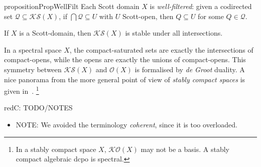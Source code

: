 \documentclass[%
  a4paper,
  UKenglish,
  cleveref,
  autoref,
  thm-restate,
  numberwithinsect,
]{lipics-v2021}
\newcommand\sle\subseteq
\newcommand\Open{\mathcal{O}}		%
\newcommand\K{\mathcal{K}}		%
\newcommand\Sat{\mathcal{S}}		%
\newenvironment{colinpar}{\begin{color}{red}\sffamily C:}{\end{color}}
\begin{document}
\begin{restatable}{proposition}{PropWellFilt}
\label{prop:sem:wf}
Each Scott domain $X$ is \emph{well-filtered}:
given a codirected
set $\mathcal{Q} \sle \K\Sat(X)$,
if $\bigcap \mathcal{Q} \sle U$ with $U$ Scott-open,
then $Q \sle U$ for some $Q \in \mathcal{Q}$.
\end{restatable}

\begin{corollary}
\label{cor:sem:ksatbigcap}
If $X$ is a Scott-domain, then $\K\Sat(X)$ is stable under all intersections.
\end{corollary}


\begin{remark}
\label{rem:sem:degroot}
In a spectral space $X$, the compact-saturated sets
are exactly the intersections of compact-opens,
while the opens are exactly the unions of compact-opens.
This symmetry between $\K\Sat(X)$ and $\Open(X)$
is formalised by \emph{de Groot} duality.
A nice panorama from the more general point
of view of \emph{stably compact spaces}
is given in~\cite{lawson11mscs}.%
\footnote{In a stably compact space $X$, $\K\Open(X)$ may not be a basis.
A stably compact algebraic dcpo is spectral.}
\lipicsEnd
\end{remark}


\begin{colinpar}
TODO/NOTES
\begin{itemize}
\item
NOTE: We avoided the terminology \emph{coherent},
since it is too overloaded.
\end{itemize}
\end{colinpar}
\end{document}
